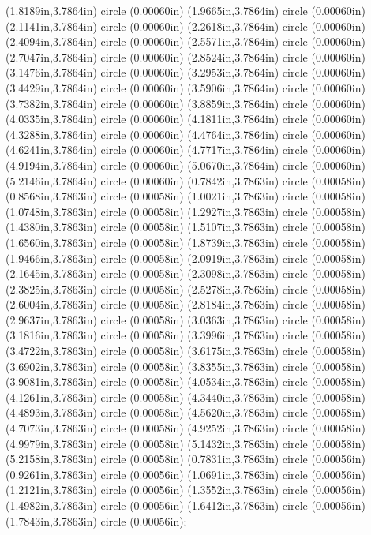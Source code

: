 (1.8189in,3.7864in) circle (0.00060in) (1.9665in,3.7864in) circle (0.00060in) (2.1141in,3.7864in) circle (0.00060in) (2.2618in,3.7864in) circle (0.00060in) (2.4094in,3.7864in) circle (0.00060in) (2.5571in,3.7864in) circle (0.00060in) (2.7047in,3.7864in) circle (0.00060in) (2.8524in,3.7864in) circle (0.00060in) (3.1476in,3.7864in) circle (0.00060in) (3.2953in,3.7864in) circle (0.00060in) (3.4429in,3.7864in) circle (0.00060in) (3.5906in,3.7864in) circle (0.00060in) (3.7382in,3.7864in) circle (0.00060in) (3.8859in,3.7864in) circle (0.00060in) (4.0335in,3.7864in) circle (0.00060in) (4.1811in,3.7864in) circle (0.00060in) (4.3288in,3.7864in) circle (0.00060in) (4.4764in,3.7864in) circle (0.00060in) (4.6241in,3.7864in) circle (0.00060in) (4.7717in,3.7864in) circle (0.00060in) (4.9194in,3.7864in) circle (0.00060in) (5.0670in,3.7864in) circle (0.00060in) (5.2146in,3.7864in) circle (0.00060in) (0.7842in,3.7863in) circle (0.00058in) (0.8568in,3.7863in) circle (0.00058in) (1.0021in,3.7863in) circle (0.00058in) (1.0748in,3.7863in) circle (0.00058in) (1.2927in,3.7863in) circle (0.00058in) (1.4380in,3.7863in) circle (0.00058in) (1.5107in,3.7863in) circle (0.00058in) (1.6560in,3.7863in) circle (0.00058in) (1.8739in,3.7863in) circle (0.00058in) (1.9466in,3.7863in) circle (0.00058in) (2.0919in,3.7863in) circle (0.00058in) (2.1645in,3.7863in) circle (0.00058in) (2.3098in,3.7863in) circle (0.00058in) (2.3825in,3.7863in) circle (0.00058in) (2.5278in,3.7863in) circle (0.00058in) (2.6004in,3.7863in) circle (0.00058in) (2.8184in,3.7863in) circle (0.00058in) (2.9637in,3.7863in) circle (0.00058in) (3.0363in,3.7863in) circle (0.00058in) (3.1816in,3.7863in) circle (0.00058in) (3.3996in,3.7863in) circle (0.00058in) (3.4722in,3.7863in) circle (0.00058in) (3.6175in,3.7863in) circle (0.00058in) (3.6902in,3.7863in) circle (0.00058in) (3.8355in,3.7863in) circle (0.00058in) (3.9081in,3.7863in) circle (0.00058in) (4.0534in,3.7863in) circle (0.00058in) (4.1261in,3.7863in) circle (0.00058in) (4.3440in,3.7863in) circle (0.00058in) (4.4893in,3.7863in) circle (0.00058in) (4.5620in,3.7863in) circle (0.00058in) (4.7073in,3.7863in) circle (0.00058in) (4.9252in,3.7863in) circle (0.00058in) (4.9979in,3.7863in) circle (0.00058in) (5.1432in,3.7863in) circle (0.00058in) (5.2158in,3.7863in) circle (0.00058in) (0.7831in,3.7863in) circle (0.00056in) (0.9261in,3.7863in) circle (0.00056in) (1.0691in,3.7863in) circle (0.00056in) (1.2121in,3.7863in) circle (0.00056in) (1.3552in,3.7863in) circle (0.00056in) (1.4982in,3.7863in) circle (0.00056in) (1.6412in,3.7863in) circle (0.00056in) (1.7843in,3.7863in) circle (0.00056in);
